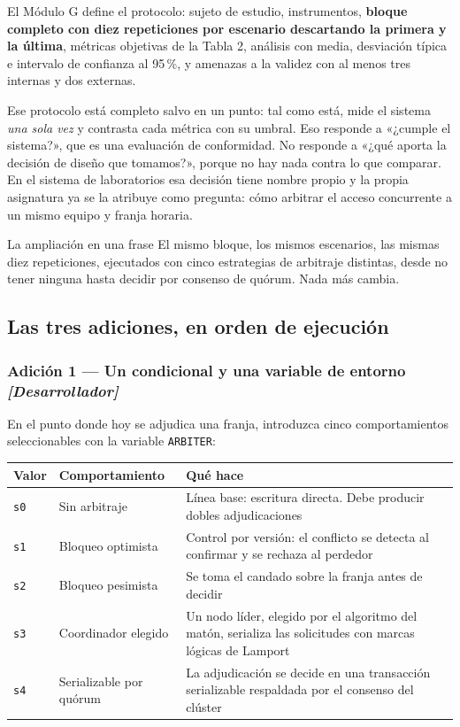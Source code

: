 \documentclass[11pt,a4paper]{article}
\begin{document}
El Módulo G define el protocolo: sujeto de estudio, instrumentos, \textbf{bloque completo con diez repeticiones por escenario descartando la primera y la última}, métricas objetivas de la Tabla 2, análisis con media, desviación típica e intervalo de confianza al 95\,\%, y amenazas a la validez con al menos tres internas y dos externas.

Ese protocolo está completo salvo en un punto: tal como está, mide el sistema \emph{una sola vez} y contrasta cada métrica con su umbral. Eso responde a «¿cumple el sistema?», que es una evaluación de conformidad. No responde a «¿qué aporta la decisión de diseño que tomamos?», porque no hay nada contra lo que comparar. En el sistema de laboratorios esa decisión tiene nombre propio y la propia asignatura ya se la atribuye como pregunta: cómo arbitrar el acceso concurrente a un mismo equipo y franja horaria.

\begin{uteqbox}{La ampliación en una frase}
	El mismo bloque, los mismos escenarios, las mismas diez repeticiones, ejecutados con cinco estrategias de arbitraje distintas, desde no tener ninguna hasta decidir por consenso de quórum. Nada más cambia.
\end{uteqbox}

\subsection{Las tres adiciones, en orden de ejecución}

\subsubsection{Adición 1 --- Un condicional y una variable de entorno \emph{[Desarrollador]}}

En el punto donde hoy se adjudica una franja, introduzca cinco comportamientos seleccionables con la variable \texttt{ARBITER}:

\begin{center}
	\small
	\begin{tabular}{@{}p{1.4cm}p{4.0cm}p{9.6cm}@{}}
		\toprule
		\textbf{Valor} & \textbf{Comportamiento} & \textbf{Qué hace} \\
		\midrule
		\texttt{s0} & Sin arbitraje & Línea base: escritura directa. Debe producir dobles adjudicaciones \\
		\texttt{s1} & Bloqueo optimista & Control por versión: el conflicto se detecta al confirmar y se rechaza al perdedor \\
		\texttt{s2} & Bloqueo pesimista & Se toma el candado sobre la franja antes de decidir \\
		\texttt{s3} & Coordinador elegido & Un nodo líder, elegido por el algoritmo del matón, serializa las solicitudes con marcas lógicas de Lamport \\
		\texttt{s4} & Serializable por quórum & La adjudicación se decide en una transacción serializable respaldada por el consenso del clúster \\
		\bottomrule
	\end{tabular}
\end{center}
\end{document}

